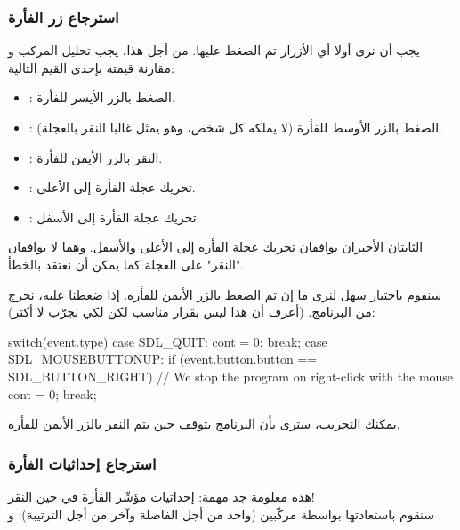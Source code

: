 \subsubsection{استرجاع زر الفأرة}

يجب أن نرى أولا أي الأزرار تم الضغط عليها. من أجل هذا، يجب تحليل المركب
و مقارنة قيمته بإحدى القيم التالية:

\begin{itemize}
	\item {}:
	الضغط بالزر الأيسر للفأرة.
	\item {}:
	الضغط بالزر الأوسط للفأرة (لا يملكه كل شخص، وهو يمثل غالبا النقر بالعجلة).
	\item {}:
	النقر بالزر الأيمن للفأرة.
	\item {}:
	تحريك عجلة الفأرة إلى الأعلى.
	\item {}:
	تحريك عجلة الفأرة إلى الأسفل.
\end{itemize}

\begin{information}
الثابتان الأخيران يوافقان تحريك عجلة الفأرة إلى الأعلى والأسفل. وهما لا يوافقان "النقر" على العجلة كما يمكن أن نعتقد بالخطأ.
\end{information}

سنقوم باختبار سهل لنرى ما إن تم الضغط بالزر الأيمن للفأرة. إذا ضغطنا عليه، نخرج من البرنامج. (أعرف أن هذا ليس بقرار مناسب لكن لكي نجرّب لا أكثر):

\begin{Csource}
switch(event.type)
{
	case SDL_QUIT:
	cont = 0;
	break;
	case SDL_MOUSEBUTTONUP:
	if (event.button.button == SDL_BUTTON_RIGHT) 
	// We stop the program on right-click with the mouse
		cont = 0;
	break;
}
\end{Csource}

يمكنك التجريب، سترى بأن البرنامج يتوقف حين يتم النقر بالزر الأيمن للفأرة.

\subsubsection{استرجاع إحداثيات الفأرة}

هذه معلومة جد مهمة: إحداثيات مؤشّر الفأرة في حين النقر!\\
سنقوم باستعادتها بواسطة مركّبين (واحد من أجل الفاصلة وآخر من أجل الترتيبة):
و
.


